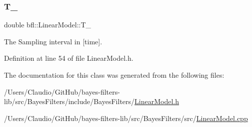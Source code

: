 \subsubsection{\texorpdfstring{T\+\_\+}{T\_}}
{\footnotesize\ttfamily double bfl\+::\+Linear\+Model\+::\+T\+\_\+\hspace{0.3cm}{\ttfamily [protected]}}



The Sampling interval in \mbox{[}time\mbox{]}. 



Definition at line 54 of file Linear\+Model.\+h.



The documentation for this class was generated from the following files\+:\begin{DoxyCompactItemize}
\item 
/\+Users/\+Claudio/\+Git\+Hub/bayes-\/filters-\/lib/src/\+Bayes\+Filters/include/\+Bayes\+Filters/\mbox{\hyperlink{LinearModel_8h}{Linear\+Model.\+h}}\item 
/\+Users/\+Claudio/\+Git\+Hub/bayes-\/filters-\/lib/src/\+Bayes\+Filters/src/\mbox{\hyperlink{LinearModel_8cpp}{Linear\+Model.\+cpp}}\end{DoxyCompactItemize}
